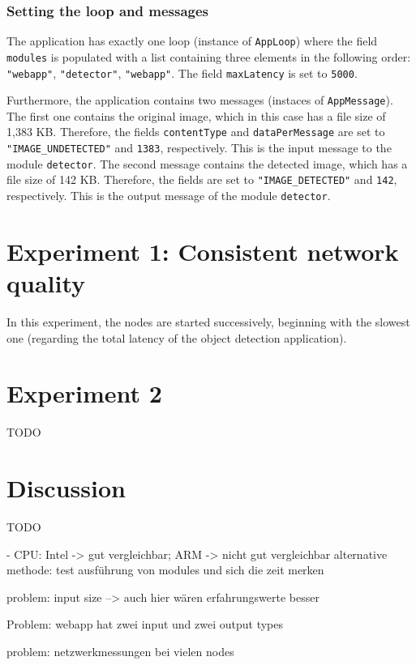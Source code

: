 \subsubsection*{Setting the loop and messages}
The application has exactly one loop (instance of \texttt{AppLoop}) where the field \texttt{modules} is populated with a list containing three elements in the following order:
\texttt{"webapp"}, \texttt{"detector"}, \texttt{"webapp"}.
The field \texttt{maxLatency} is set to \texttt{5000}.

Furthermore, the application contains two messages (instaces of \texttt{AppMessage}).
The first one contains the original image, which in this case has a file size of 1,383 KB. Therefore, the fields \texttt{contentType} and \texttt{dataPerMessage} are set to \texttt{"IMAGE\_UNDETECTED"} and  \texttt{1383}, respectively. This is the input message to the module \texttt{detector}.
The second message contains the detected image, which has a file size of 142 KB. Therefore, the fields are set to \texttt{"IMAGE\_DETECTED"} and \texttt{142}, respectively. This is the output message of the module \texttt{detector}.


\section{Experiment 1: Consistent network quality\label{sec:eval-exp-1}}

In this experiment, the nodes are started successively, beginning with the slowest one (regarding the total latency of the object detection application).

\section{Experiment 2}

TODO

\section{Discussion}

TODO

- CPU: Intel -> gut vergleichbar; ARM -> nicht gut vergleichbar
alternative methode: test ausführung von modules und sich die zeit merken

problem: input size --> auch hier wären erfahrungswerte besser

Problem: webapp hat zwei input und zwei output types

problem: netzwerkmessungen bei vielen nodes